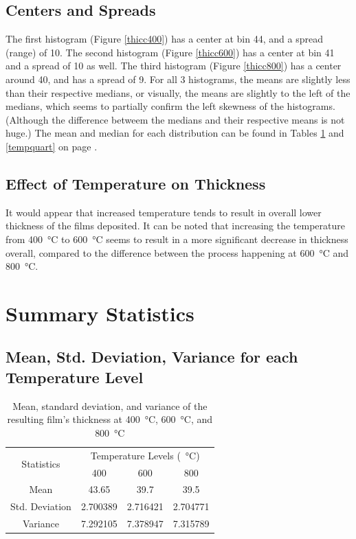 \documentclass[letterpaper]{article}
\begin{document}
\subsection{Centers and Spreads}
The first histogram (Figure \ref{thicc400}) has a center at bin 44, and a spread
(range) of 10. The second histogram (Figure \ref{thicc600}) has a center at bin
41 and a spread of 10 as well. The third histogram (Figure \ref{thicc800}) has a
center around 40, and has a spread of 9. For all 3 histograms, the means are
slightly less than their respective medians, or visually, the means are slightly
to the left of the medians, which seems to partially confirm the left skewness
of the histograms. (Although the difference betweem the medians and their
respective means is not huge.) The mean and median for each distribution can be
found in Tables \ref{tempmean} and \ref{tempquart} on page \pageref{tempmean}.


\subsection{Effect of Temperature on Thickness}
It would appear that increased temperature tends to result in overall lower
thickness of the films deposited. It can be noted that increasing the
temperature from \SI{400}{\celsius} to \SI{600}{\celsius} seems to result in a
more significant decrease in thickness overall, compared to the difference
between the process happening at \SI{600}{\celsius} and \SI{800}{\celsius}.

\section{Summary Statistics}

\subsection{Mean, Std. Deviation, Variance for each Temperature Level}

\begin{table}[H]
 \centering
 \begin{tabular}{c|c|c|c|}
  \multirow{2}{*}{Statistics} & \multicolumn{3}{c|}{Temperature Levels (\SI{}{\celsius})}                       \\ \cline{2-4}
                              & 400                                                       & 600      & 800      \\ \hline
  Mean                        & 43.65                                                     & 39.7     & 39.5     \\ \hline
  Std. Deviation              & 2.700389                                                  & 2.716421 & 2.704771 \\ \hline
  Variance                    & 7.292105                                                  & 7.378947 & 7.315789 \\ \hline
 \end{tabular}
 \caption{Mean, standard deviation, and variance of the resulting film's thickness at \SI{400}{\celsius}, \SI{600}{\celsius}, and \SI{800}{\celsius}}
 \label{tempmean}
\end{table}
\end{document}
